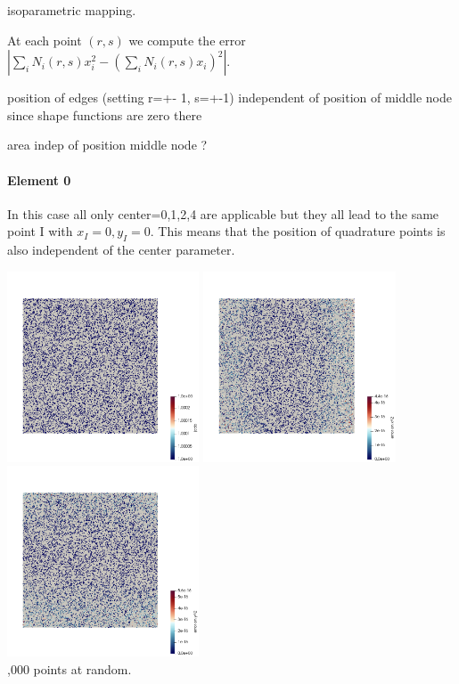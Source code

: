 isoparametric mapping. 


At each point $(r,s)$ we compute the error $|\sum_i N_i(r,s) x_i^2 - (\sum_i N_i(r,s) x_i)^2|$.

position of edges (setting r=+- 1, s=+-1) independent of position of middle node since shape functions are zero there

area indep of position middle node ?



\paragraph{Element 0}

In this case all only {\python center=0,1,2,4} are applicable but they all 
lead to the same point I with $x_I=0,y_I=0$. This means that the position of 
quadrature points is also independent of the {\python center} parameter.
 
\begin{center}
\includegraphics[width=5.7cm]{images/mappings/biquadratic3/elt0/jcob}
\includegraphics[width=5.7cm]{images/mappings/biquadratic3/elt0/error_posx2}
\includegraphics[width=5.7cm]{images/mappings/biquadratic3/elt0/error_posy2}\\
{,000 points at random.} 
\end{center}

